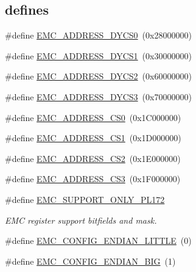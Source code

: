 \subsection*{\textquotesingle{}defines\textquotesingle{}}
\begin{DoxyCompactItemize}
\item 
\#define \hyperlink{group___e_m_c__18_x_x__43_x_x_gaefabc84f3652e1bea098a5a2c4d2bba7}{E\+M\+C\+\_\+\+A\+D\+D\+R\+E\+S\+S\+\_\+\+D\+Y\+C\+S0}~(0x28000000)
\item 
\#define \hyperlink{group___e_m_c__18_x_x__43_x_x_gad99ea901e664ef1be28e4864d8015888}{E\+M\+C\+\_\+\+A\+D\+D\+R\+E\+S\+S\+\_\+\+D\+Y\+C\+S1}~(0x30000000)
\item 
\#define \hyperlink{group___e_m_c__18_x_x__43_x_x_gaba0163f1b4a091ec23b7e2523dd126dc}{E\+M\+C\+\_\+\+A\+D\+D\+R\+E\+S\+S\+\_\+\+D\+Y\+C\+S2}~(0x60000000)
\item 
\#define \hyperlink{group___e_m_c__18_x_x__43_x_x_ga5821429ee664a6885f494cf951085b4a}{E\+M\+C\+\_\+\+A\+D\+D\+R\+E\+S\+S\+\_\+\+D\+Y\+C\+S3}~(0x70000000)
\item 
\#define \hyperlink{group___e_m_c__18_x_x__43_x_x_ga128f03ce6dd1a7f821d0ab1a53e11ac4}{E\+M\+C\+\_\+\+A\+D\+D\+R\+E\+S\+S\+\_\+\+C\+S0}~(0x1\+C000000)
\item 
\#define \hyperlink{group___e_m_c__18_x_x__43_x_x_ga46923aa8eb0091747c2bb16bbb801b4c}{E\+M\+C\+\_\+\+A\+D\+D\+R\+E\+S\+S\+\_\+\+C\+S1}~(0x1\+D000000)
\item 
\#define \hyperlink{group___e_m_c__18_x_x__43_x_x_ga75f1c0adaf16b406c3ff78bb872365e1}{E\+M\+C\+\_\+\+A\+D\+D\+R\+E\+S\+S\+\_\+\+C\+S2}~(0x1\+E000000)
\item 
\#define \hyperlink{group___e_m_c__18_x_x__43_x_x_ga6e968a46ed51863a410b7069858be043}{E\+M\+C\+\_\+\+A\+D\+D\+R\+E\+S\+S\+\_\+\+C\+S3}~(0x1\+F000000)
\item 
\#define \hyperlink{group___e_m_c__18_x_x__43_x_x_ga71bcb83ea9d85aa3cdced2b2200fcd1b}{E\+M\+C\+\_\+\+S\+U\+P\+P\+O\+R\+T\+\_\+\+O\+N\+L\+Y\+\_\+\+P\+L172}
\begin{DoxyCompactList}\small\item\em E\+MC register support bitfields and mask. \end{DoxyCompactList}\item 
\#define \hyperlink{group___e_m_c__18_x_x__43_x_x_ga462cbdd5923b1b220243f96570af6974}{E\+M\+C\+\_\+\+C\+O\+N\+F\+I\+G\+\_\+\+E\+N\+D\+I\+A\+N\+\_\+\+L\+I\+T\+T\+LE}~(0)
\item 
\#define \hyperlink{group___e_m_c__18_x_x__43_x_x_ga7ac66f11798aef973174c398d877d0bf}{E\+M\+C\+\_\+\+C\+O\+N\+F\+I\+G\+\_\+\+E\+N\+D\+I\+A\+N\+\_\+\+B\+IG}~(1)

\end{DoxyCompactItemize}

